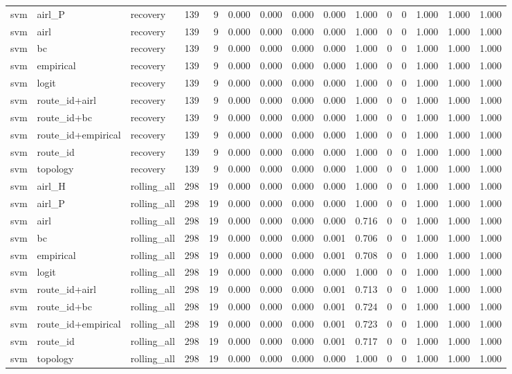 \begin{tabular}{lllrrrrrrrrrrrr}
svm & airl_P & recovery & 139 & 9 & 0.000 & 0.000 & 0.000 & 0.000 & 1.000 & 0 & 0 & 1.000 & 1.000 & 1.000 \\
svm & airl & recovery & 139 & 9 & 0.000 & 0.000 & 0.000 & 0.000 & 1.000 & 0 & 0 & 1.000 & 1.000 & 1.000 \\
svm & bc & recovery & 139 & 9 & 0.000 & 0.000 & 0.000 & 0.000 & 1.000 & 0 & 0 & 1.000 & 1.000 & 1.000 \\
svm & empirical & recovery & 139 & 9 & 0.000 & 0.000 & 0.000 & 0.000 & 1.000 & 0 & 0 & 1.000 & 1.000 & 1.000 \\
svm & logit & recovery & 139 & 9 & 0.000 & 0.000 & 0.000 & 0.000 & 1.000 & 0 & 0 & 1.000 & 1.000 & 1.000 \\
svm & route_id+airl & recovery & 139 & 9 & 0.000 & 0.000 & 0.000 & 0.000 & 1.000 & 0 & 0 & 1.000 & 1.000 & 1.000 \\
svm & route_id+bc & recovery & 139 & 9 & 0.000 & 0.000 & 0.000 & 0.000 & 1.000 & 0 & 0 & 1.000 & 1.000 & 1.000 \\
svm & route_id+empirical & recovery & 139 & 9 & 0.000 & 0.000 & 0.000 & 0.000 & 1.000 & 0 & 0 & 1.000 & 1.000 & 1.000 \\
svm & route_id & recovery & 139 & 9 & 0.000 & 0.000 & 0.000 & 0.000 & 1.000 & 0 & 0 & 1.000 & 1.000 & 1.000 \\
svm & topology & recovery & 139 & 9 & 0.000 & 0.000 & 0.000 & 0.000 & 1.000 & 0 & 0 & 1.000 & 1.000 & 1.000 \\
svm & airl_H & rolling_all & 298 & 19 & 0.000 & 0.000 & 0.000 & 0.000 & 1.000 & 0 & 0 & 1.000 & 1.000 & 1.000 \\
svm & airl_P & rolling_all & 298 & 19 & 0.000 & 0.000 & 0.000 & 0.000 & 1.000 & 0 & 0 & 1.000 & 1.000 & 1.000 \\
svm & airl & rolling_all & 298 & 19 & 0.000 & 0.000 & 0.000 & 0.000 & 0.716 & 0 & 0 & 1.000 & 1.000 & 1.000 \\
svm & bc & rolling_all & 298 & 19 & 0.000 & 0.000 & 0.000 & 0.001 & 0.706 & 0 & 0 & 1.000 & 1.000 & 1.000 \\
svm & empirical & rolling_all & 298 & 19 & 0.000 & 0.000 & 0.000 & 0.001 & 0.708 & 0 & 0 & 1.000 & 1.000 & 1.000 \\
svm & logit & rolling_all & 298 & 19 & 0.000 & 0.000 & 0.000 & 0.000 & 1.000 & 0 & 0 & 1.000 & 1.000 & 1.000 \\
svm & route_id+airl & rolling_all & 298 & 19 & 0.000 & 0.000 & 0.000 & 0.001 & 0.713 & 0 & 0 & 1.000 & 1.000 & 1.000 \\
svm & route_id+bc & rolling_all & 298 & 19 & 0.000 & 0.000 & 0.000 & 0.001 & 0.724 & 0 & 0 & 1.000 & 1.000 & 1.000 \\
svm & route_id+empirical & rolling_all & 298 & 19 & 0.000 & 0.000 & 0.000 & 0.001 & 0.723 & 0 & 0 & 1.000 & 1.000 & 1.000 \\
svm & route_id & rolling_all & 298 & 19 & 0.000 & 0.000 & 0.000 & 0.001 & 0.717 & 0 & 0 & 1.000 & 1.000 & 1.000 \\
svm & topology & rolling_all & 298 & 19 & 0.000 & 0.000 & 0.000 & 0.000 & 1.000 & 0 & 0 & 1.000 & 1.000 & 1.000 \\
\bottomrule
\end{tabular}
